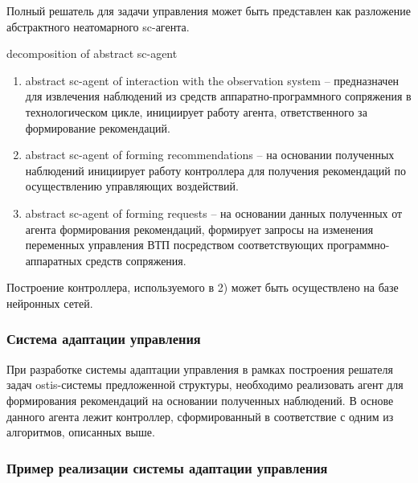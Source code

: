 Полный решатель для задачи управления может быть представлен как разложение абстрактного неатомарного sc-агента.


\begin{SCn}
\begin{scnrelfromset}{decomposition of abstract sc-agent}
\end{scnrelfromset}
\end{SCn}

\begin{enumerate}
    \item abstract sc-agent of interaction with the observation system – предназначен для извлечения наблюдений из средств аппаратно-программного сопряжения в технологическом цикле, инициирует работу агента, ответственного за формирование рекомендаций.
    \item abstract sc-agent of forming recommendations – на основании полученных наблюдений инициирует работу контроллера для получения рекомендаций по осуществлению управляющих воздействий.
    \item abstract sc-agent of forming requests – на основании данных полученных от агента формирования рекомендаций, формирует запросы на  изменения переменных управления ВТП посредством соответствующих программно-аппаратных средств сопряжения.

\end{enumerate}

Построение контроллера, используемого в 2) может быть осуществлено на базе нейронных сетей.



\subsubsection{Система адаптации управления}

При разработке  системы адаптации управления в рамках построения решателя задач ostis-системы предложенной структуры, необходимо реализовать агент для формирования рекомендаций на основании полученных наблюдений. В основе данного агента лежит контроллер, сформированный в соответствие с одним из алгоритмов, описанных выше.



\subsubsection{Пример реализации системы адаптации управления}

